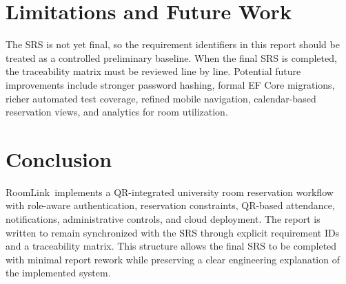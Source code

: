 \documentclass[conference]{IEEEtran}
\newcommand{\RoomLink}{RoomLink}
\begin{document}
\section{Limitations and Future Work}
The SRS is not yet final, so the requirement identifiers in this report should
be treated as a controlled preliminary baseline. When the final SRS is
completed, the traceability matrix must be reviewed line by line. Potential
future improvements include stronger password hashing, formal EF Core
migrations, richer automated test coverage, refined mobile navigation,
calendar-based reservation views, and analytics for room utilization.

\section{Conclusion}
\RoomLink\ implements a QR-integrated university room reservation workflow
with role-aware authentication, reservation constraints, QR-based attendance,
notifications, administrative controls, and cloud deployment. The report is
written to remain synchronized with the SRS through explicit requirement IDs
and a traceability matrix. This structure allows the final SRS to be completed
with minimal report rework while preserving a clear engineering explanation of
the implemented system.



\end{document}
